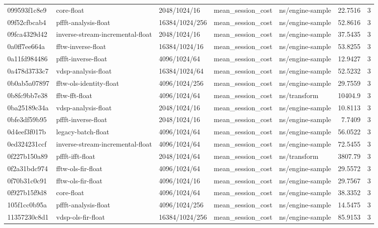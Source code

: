 \begin{longtable}{lllllrr}
099593f1c8e9 & core-float & 2048/1024/16 & mean\_session\_cost & ns/engine-sample & 22.7516 & 3 \\
09f52cfbcab4 & pffft-analysis-float & 16384/1024/256 & mean\_session\_cost & ns/engine-sample & 52.8616 & 3 \\
09fca4329d42 & inverse-stream-incremental-float & 2048/1024/16 & mean\_session\_cost & ns/engine-sample & 37.5435 & 3 \\
0a0ff7ee664a & fftw-inverse-float & 16384/1024/16 & mean\_session\_cost & ns/engine-sample & 53.8255 & 3 \\
0a11fd984486 & pffft-inverse-float & 4096/1024/64 & mean\_session\_cost & ns/engine-sample & 12.9427 & 3 \\
0a478d3733c7 & vdsp-analysis-float & 16384/1024/64 & mean\_session\_cost & ns/engine-sample & 52.5232 & 3 \\
0b0ab5a07897 & fftw-ols-identity-float & 4096/1024/256 & mean\_session\_cost & ns/engine-sample & 29.7559 & 3 \\
0b8fc9bb7e38 & fftw-fft-float & 4096/1024/64 & mean\_session\_cost & ns/transform & 10404.9 & 3 \\
0ba25189c34a & vdsp-analysis-float & 2048/1024/16 & mean\_session\_cost & ns/engine-sample & 10.8113 & 3 \\
0bfe3df59b95 & pffft-inverse-float & 2048/1024/16 & mean\_session\_cost & ns/engine-sample & 7.7409 & 3 \\
0d4eef3f017b & legacy-batch-float & 4096/1024/64 & mean\_session\_cost & ns/engine-sample & 56.0522 & 3 \\
0ed324231ccf & inverse-stream-incremental-float & 4096/1024/64 & mean\_session\_cost & ns/engine-sample & 72.5455 & 3 \\
0f227b150a89 & pffft-ifft-float & 2048/1024/64 & mean\_session\_cost & ns/transform & 3807.79 & 3 \\
0f2a31bdc974 & fftw-ols-fir-float & 4096/1024/64 & mean\_session\_cost & ns/engine-sample & 29.5572 & 3 \\
0f70b31c0c91 & fftw-ols-fir-float & 4096/1024/16 & mean\_session\_cost & ns/engine-sample & 29.7567 & 3 \\
0f927b15f9d8 & core-float & 4096/1024/64 & mean\_session\_cost & ns/engine-sample & 38.3352 & 3 \\
105f1cc0b95a & pffft-analysis-float & 4096/1024/256 & mean\_session\_cost & ns/engine-sample & 14.5475 & 3 \\
11357230c8d1 & vdsp-ols-fir-float & 16384/1024/256 & mean\_session\_cost & ns/engine-sample & 85.9153 & 3 \\

\end{longtable}
